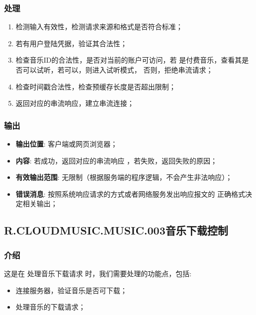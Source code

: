 \subsubsection{处理}
	\begin{enumerate}
		\item 检测输入有效性，检测请求来源和格式是否符合标准；
		\item 若有用户登陆凭据，验证其合法性；
		\item 检查音乐ID的合法性，是否对当前的账户可访问，若
			是付费音乐，查看其是否可以试听，若可以，则进入试听模式，
			否则，拒绝串流请求；
		\item 检查时间戳合法性，检查预缓存长度是否超出限制；
		\item 返回对应的串流响应，建立串流连接；
	\end{enumerate}
\subsubsection{输出}
\begin{itemize}
	\item \textbf{输出位置}: 客户端或网页浏览器；
	\item \textbf{内容}: 若成功，返回对应的串流响应 ，若失败，返回失败的原因；
	\item \textbf{有效输出范围}: 无限制（根据服务端的程序逻辑，不会产生非法响应）；
	\item \textbf{错误消息}: 按照系统响应请求的方式或者网络服务发出响应报文的
		正确格式决定相关输出；
\end{itemize}

\subsection{R.CLOUDMUSIC.MUSIC.003音乐下载控制}
\subsubsection{介绍}
	这是在 处理音乐下载请求 时，我们需要处理的功能点，包括: 
	\begin{itemize}
		\item 连接服务器，验证音乐是否可下载；
		\item 处理音乐的下载请求；
	\end{itemize}
